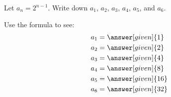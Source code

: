 \documentclass{ximera}
\begin{document}
\begin{example}
  Let $a_n = 2^{n-1}$.  Write down $a_1$, $a_2$, $a_3$, $a_4$, $a_5$, and
  $a_6$.
  \begin{explanation}
    Use the formula to see:
    \begin{align*}
      a_1 &= \answer[given]{1}\\
      a_2 &= \answer[given]{2}\\
      a_3 &= \answer[given]{4}\\
      a_4 &= \answer[given]{8}\\
      a_5 &= \answer[given]{16}\\
      a_6 &= \answer[given]{32}
    \end{align*}
  \end{explanation}
\end{example}
\end{document}
